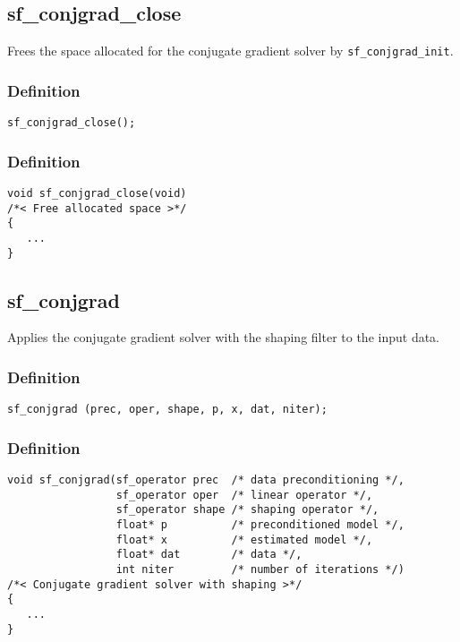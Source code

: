 \subsection{{sf\_conjgrad\_close}}
Frees the space allocated for the conjugate gradient solver by \texttt{sf\_conjgrad\_init}.

\subsubsection*{Definition}
\begin{verbatim}
sf_conjgrad_close();\end{verbatim}

\subsubsection*{Definition}
\begin{verbatim}
void sf_conjgrad_close(void) 
/*< Free allocated space >*/
{
   ...
}
\end{verbatim}




\subsection{{sf\_conjgrad}}
Applies the conjugate gradient solver with the shaping filter to the input data.

\subsubsection*{Definition}
\begin{verbatim}sf_conjgrad (prec, oper, shape, p, x, dat, niter);\end{verbatim}

\subsubsection*{Definition}
\begin{verbatim}
void sf_conjgrad(sf_operator prec  /* data preconditioning */, 
                 sf_operator oper  /* linear operator */, 
                 sf_operator shape /* shaping operator */, 
                 float* p          /* preconditioned model */, 
                 float* x          /* estimated model */, 
                 float* dat        /* data */, 
                 int niter         /* number of iterations */) 
/*< Conjugate gradient solver with shaping >*/
{
   ...
}
\end{verbatim}

